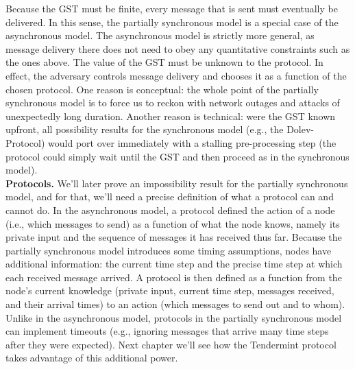 Because the GST must be finite, every message that is sent must eventually be delivered.
In this sense, the partially synchronous model is a special case of the asynchronous model.
The asynchronous model is strictly more general, as message delivery there does not need
to obey any quantitative constraints such as the ones above.
The value of the GST must be unknown to the protocol. In effect, the adversary
controls message delivery and chooses it as a function of the chosen protocol. One reason
is conceptual: the whole point of the partially synchronous model is to force us to reckon with
network outages and attacks of unexpectedly long duration. Another reason is technical:
were the GST known upfront, all possibility results for the synchronous model (e.g., the
Dolev-Protocol) would port over immediately with a stalling pre-processing step (the protocol
could simply wait until the GST and then proceed as in the synchronous model).\\

\noindent
\textbf{Protocols.} We’ll later prove an impossibility result for the partially synchronous
model, and for that, we’ll need a precise definition of what a protocol can and cannot do. In
the asynchronous model, a protocol defined the action of a node (i.e., which messages to send)
as a function of what the node knows, namely its private input and the sequence of messages
it has received thus far. Because the partially synchronous model introduces some timing
assumptions, nodes have additional information: the current time step and the precise
time step at which each received message arrived. A protocol is then defined as a function
from the node’s current knowledge (private input, current time step, messages received, and
their arrival times) to an action (which messages to send out and to whom). Unlike in the
asynchronous model, protocols in the partially synchronous model can implement timeouts
(e.g., ignoring messages that arrive many time steps after they were expected). Next chapter
we’ll see how the Tendermint protocol takes advantage of this additional power.\\

